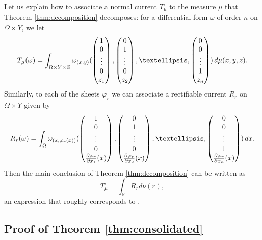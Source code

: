\documentclass{article}
\newcommand{\R}{\mathbb{R}}
\theoremstyle{definition}
\theoremstyle{remark}
\begin{document}
Let us explain how to associate a normal current $T_\mu$ to the measure $\mu$ that Theorem \ref{thm:decomposition} decomposes: for a differential form $\omega$ of order $n$ on $\Omega\times Y$, we let
\[T_\mu(\omega)=\int_{\Omega\times Y\times Z}
\omega_{(x,y)}(\tiny\begin{pmatrix}
 1\\0\\\vdots\\0\\z_1
\end{pmatrix},
\begin{pmatrix}
 0\\1\\\vdots\\0\\z_2
\end{pmatrix},
\dots,
\begin{pmatrix}
 0\\0\\\vdots\\1\\z_n
\end{pmatrix})\,d\mu(x,y,z).
\]
Similarly, to each of the sheets $\varphi_r$ %
we can associate a rectifiable current $R_r$ on $\Omega\times Y$ given by
\[R_r(\omega)=\int_{\Omega}
\omega_{(x,\varphi_r(x))}(\tiny\begin{pmatrix}
 1\\0\\\vdots\\0\\\frac{\partial\varphi_r}{\partial x_1}(x)
\end{pmatrix},
\begin{pmatrix}
 0\\1\\\vdots\\0\\\frac{\partial\varphi_r}{\partial x_2}(x)
\end{pmatrix},
\dots,
\begin{pmatrix}
 0\\0\\\vdots\\1\\\frac{\partial\varphi_r}{\partial x_n}(x)
\end{pmatrix})\,dx.
\]
Then the main conclusion of Theorem \ref{thm:decomposition} can be written as
\[T_\mu=\int_\R R_rd\nu(r),\]
an expression that roughly corresponds to \cite[eqs. (2), (8)]{zworski1988decomposition}.


\subsection{{Proof of Theorem \ref{thm:consolidated}}}
\label{sec:proof2}
%
\end{document}

